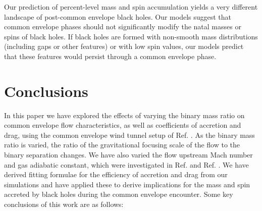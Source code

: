 Our prediction of percent-level mass and spin accumulation yields a very different landscape of post-common envelope black holes. Our models suggest that common envelope phases should not significantly modify the natal masses or spins of black holes. If black holes are formed with non-smooth  mass distributions (including gaps or other features) or with low spin values, our models predict that these features would persist through a common envelope phase. 

\vspace{5mm}
\section{Conclusions}\label{sec:conclusions}
In this paper we have explored the effects of varying the binary mass ratio on common envelope flow characteristics, as well as coefficients of accretion and drag, using the common envelope wind tunnel setup of Ref. \cite{MacLeod:2017}. As the binary mass ratio is varied, the ratio of the gravitational focusing scale of the flow to the binary separation changes.
We have also varied the flow upstream Mach number and gas adiabatic constant, which were investigated in Ref. \cite{MacLeod:2017} and Ref. \cite{MacLeod_2015}. We have derived fitting formulae for the efficiency of accretion and drag from our simulations and have applied these to derive implications for the mass and spin accreted by black holes during the common envelope encounter. Some key conclusions of this work are as follows:

